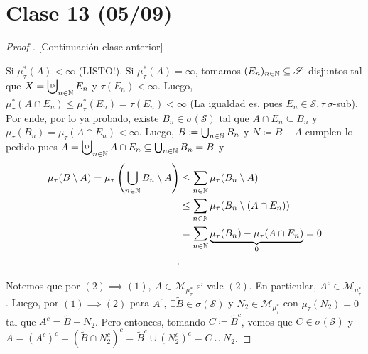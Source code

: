 \section{Clase 13 (05/09)}

\begin{proof}[Proof ][Continuación clase anterior]
	\text{} \par
	\noindent {} Si $\mu_{\tau}^{*}(A) < \infty$ (LISTO!). Si $\mu_{\tau}^{*}(A) = \infty$, tomamos $(E_n)_{n\in\mathbb{N}} \subseteq \mathscr{S}$ disjuntos tal que $X = \bigcupd_{n\in\N} E_n$ y $\tau(E_n) < \infty$. Luego, $\mu_{\tau}^{*}(A \cap E_n) \leq \mu_{\tau}^{*} (E_n) = \tau(E_n) < \infty$ (La igualdad es, pues $E_n \in \mathscr{S}, \tau \ \sigma$-sub). Por ende, por lo ya probado, existe $B_n \in \sigma(\mathscr{S})$ tal que $A \cap E_n \subseteq B_n$ y $\mu_{\tau}(B_n) = \mu_{\tau}(A \cap E_n) < \infty$. Luego, $B \coloneq \bigcup_{n\in\mathbb{N}} B_n$ y $N \coloneq B-A$ cumplen lo pedido pues $A = \bigcupd_{n\in\N} A \cap E_n \subseteq \bigcup_{n\in\N} B_n = B$ y
	\begin{align*}
		\mu_{\tau}(B\setminus A) = \mu_{\tau}\left( \bigcup_{n\in\mathbb{N}} B_n \setminus A \right) & \leq \sum_{n\in\mathbb{N}} \mu_{\tau}(B_n \setminus A) \\
		& \leq \sum_{n\in\mathbb{N}} \mu_{\tau}(B_n \setminus (A \cap E_n)) \\
		&= \sum_{n\in\mathbb{N}} \underbrace{\mu_{\tau}(B_n) - \mu_{\tau}(A \cap E_n)}_{0} = 0 \\
	.\end{align*}

	\noindent {} Notemos que por $(2) \implies (1),\ A \in \mathscr{M}_{\mu_{\tau}^{*}}$ si vale $(2)$. En particular, $A^c \in \mathscr{M}_{\mu_{\tau}^{*}}$. Luego, por $(1) \implies (2)$ para $A^c,\ \exists \widetilde{B} \in \sigma(\mathscr{S})$ y $N_2 \in \mathscr{M}_{\mu_{\tau}^{*}}$ con $\mu_{\tau}(N_{2}) = 0$ tal que $A^c = \widetilde{B} - N_{2}$. Pero entonces, tomando $C \coloneq \widetilde{B}^c$, vemos que $C \in \sigma(\mathscr{S})$ y $A = (A^c)^c = (\widetilde{B} \cap N_{2}^c)^c = \widetilde{B}^c \cup (N_{2}^c)^c = C \cup N_2$.
\end{proof}


